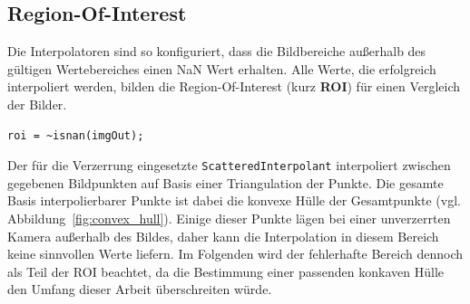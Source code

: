 \subsection{Region-Of-Interest}
\label{sec:roi}
Die Interpolatoren sind so konfiguriert, dass die Bildbereiche außerhalb des gültigen Wertebereiches einen NaN Wert erhalten. Alle Werte, die erfolgreich interpoliert werden, bilden die Region-Of-Interest (kurz \textbf{ROI}) für einen Vergleich der Bilder.
\begin{lstlisting}[style=Matlab-editor,basicstyle=\mlttfamily]
%% Bestimmung der Region of Interest für Entzerrung
roi = ~isnan(imgOut);
\end{lstlisting}
Der für die Verzerrung eingesetzte \texttt{ScatteredInterpolant} interpoliert zwischen gegebenen Bildpunkten auf Basis einer Triangulation der Punkte. Die gesamte Basis interpolierbarer Punkte ist dabei die konvexe Hülle der Gesamtpunkte (vgl. Abbildung~\ref{fig:convex_hull}). Einige dieser Punkte lägen bei einer unverzerrten Kamera außerhalb des Bildes, daher kann die Interpolation in diesem Bereich keine sinnvollen Werte liefern. Im Folgenden wird der fehlerhafte Bereich dennoch als Teil der ROI beachtet, da die Bestimmung einer passenden konkaven Hülle den Umfang dieser Arbeit überschreiten würde.

